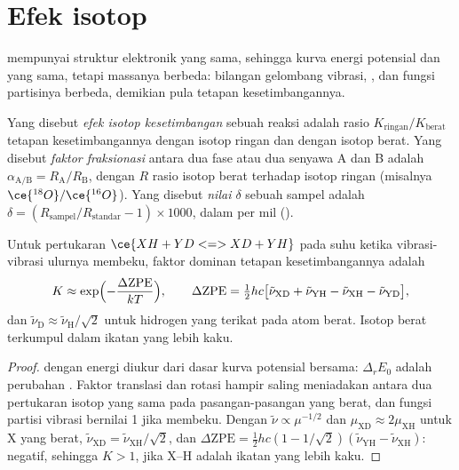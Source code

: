 \section{Efek isotop}

 mempunyai struktur elektronik yang sama, sehingga kurva
energi potensial dan  yang sama, tetapi massanya berbeda:
bilangan gelombang vibrasi, , dan fungsi partisinya berbeda,
demikian pula tetapan kesetimbangannya.

\begin{definition}\label{def:b3:statistical-thermo-applied:isotope-effect}
Yang disebut \emph{efek isotop kesetimbangan}
sebuah reaksi adalah rasio $K_{\mathrm{ringan}}/K_{\mathrm{berat}}$ tetapan
kesetimbangannya dengan isotop ringan dan dengan isotop berat. Yang disebut
\emph{faktor fraksionasi} antara dua fase atau dua
senyawa A dan B adalah $\alpha_{\mathrm{A/B}} = R_{\mathrm A}/R_{\mathrm B}$, dengan $R$
rasio isotop berat terhadap isotop ringan (misalnya $\ce{^{18}O}/\ce{^{16}O}$).
Yang disebut \emph{nilai $\delta$} sebuah sampel adalah
$\delta = (R_{\mathrm{sampel}}/R_{\mathrm{standar}}
- 1) \times 1000$, dalam per mil (\textperthousand).
\end{definition}

\begin{proposition}\label{prop:b3:statistical-thermo-applied:zpe-isotope}
Untuk pertukaran $\ce{XH + YD <=> XD + YH}$ pada suhu ketika vibrasi-vibrasi
ulurnya membeku, faktor dominan tetapan kesetimbangannya adalah
\[
  K \approx \exp\Bigl(-\frac{\Delta\mathrm{ZPE}}{kT}\Bigr), \qquad
  \Delta\mathrm{ZPE} = \tfrac12hc\bigl[\tilde\nu_{\mathrm{XD}} + \tilde\nu_{\mathrm{YH}} - \tilde\nu_{\mathrm{XH}} - \tilde\nu_{\mathrm{YD}}\bigr],
\]
dan $\tilde\nu_{\mathrm D} \approx \tilde\nu_{\mathrm H}/\sqrt2$ untuk hidrogen yang terikat pada
atom berat. Isotop berat terkumpul dalam ikatan yang lebih kaku.
\end{proposition}

\begin{proof}
 dengan energi diukur dari
dasar kurva potensial bersama: $\Delta_rE_0$ adalah perubahan .
Faktor translasi dan rotasi hampir saling meniadakan antara dua pertukaran
isotop yang sama pada pasangan-pasangan yang berat, dan fungsi partisi vibrasi
bernilai 1 jika membeku. Dengan $\tilde\nu \propto \mu^{-1/2}$ dan
$\mu_{\mathrm{XD}} \approx 2\mu_{\mathrm{XH}}$ untuk X yang berat,
$\tilde\nu_{\mathrm{XD}} = \tilde\nu_{\mathrm{XH}}/\sqrt2$, dan $\Delta\mathrm{ZPE} =
\frac12hc(1 - 1/\sqrt2)(\tilde\nu_{\mathrm{YH}} - \tilde\nu_{\mathrm{XH}})$: negatif, sehingga
$K > 1$, jika X--H adalah ikatan yang lebih kaku.
\end{proof}

